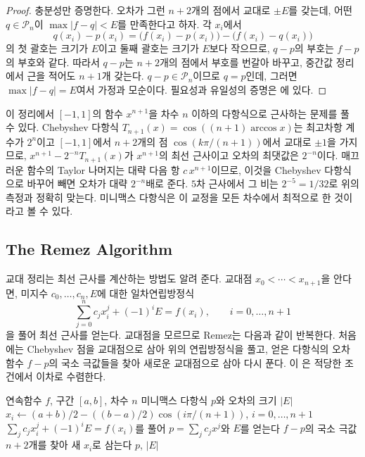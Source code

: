 \begin{proof}
충분성만 증명한다. 오차가 그런 $n+2$개의 점에서 교대로 $\pm E$를 갖는데, 어떤 $q\in\mathcal P_n$이 $\max|f-q|<E$를 만족한다고 하자. 각 $x_i$에서
\[
q(x_i)-p(x_i)=\bigl(f(x_i)-p(x_i)\bigr)-\bigl(f(x_i)-q(x_i)\bigr)
\]
의 첫 괄호는 크기가 $E$이고 둘째 괄호는 크기가 $E$보다 작으므로, $q-p$의 부호는 $f-p$의 부호와 같다. 따라서 $q-p$는 $n+2$개의 점에서 부호를 번갈아 바꾸고, 중간값 정리에서 근을 적어도 $n+1$개 갖는다. $q-p\in\mathcal P_n$이므로 $q=p$인데, 그러면 $\max|f-q|=E$여서 가정과 모순이다. 필요성과 유일성의 증명은 \cite{cheney1998}에 있다.
\end{proof}

이 정리에서 $[-1,1]$의 함수 $x^{n+1}$을 차수 $n$ 이하의 다항식으로 근사하는 문제를 풀 수 있다. Chebyshev 다항식 $T_{n+1}(x)=\cos((n+1)\arccos x)$는 최고차항 계수가 $2^n$이고 $[-1,1]$에서 $n+2$개의 점 $\cos(k\pi/(n+1))$에서 교대로 $\pm1$을 가지므로, $x^{n+1}-2^{-n}T_{n+1}(x)$가 $x^{n+1}$의 최선 근사이고 오차의 최댓값은 $2^{-n}$이다. 매끄러운 함수의 Taylor 나머지는 대략 다음 항 $c\,x^{n+1}$이므로, 이것을 Chebyshev 다항식으로 바꾸어 빼면 오차가 대략 $2^{-n}$배로 준다. $5$차 근사에서 그 비는 $2^{-5}=1/32$로 위의 측정과 정확히 맞는다. 미니맥스 다항식은 이 교정을 모든 차수에서 최적으로 한 것이라고 볼 수 있다.

\subsection{The Remez Algorithm}

교대 정리는 최선 근사를 계산하는 방법도 알려 준다. 교대점 $x_0<\cdots<x_{n+1}$을 안다면, 미지수 $c_0,\dots,c_n,E$에 대한 일차연립방정식
\[
\sum_{j=0}^nc_jx_i^j+(-1)^iE=f(x_i),\qquad i=0,\dots,n+1
\]
을 풀어 최선 근사를 얻는다. 교대점을 모르므로 Remez는 다음과 같이 반복한다. 처음에는 Chebyshev 점을 교대점으로 삼아 위의 연립방정식을 풀고, 얻은 다항식의 오차 함수 $f-p$의 국소 극값들을 찾아 새로운 교대점으로 삼아 다시 푼다. 이 은 적당한 조건에서 이차로 수렴한다\cite{trefethen2019atap}.

\begin{algorithm}[t]
\begin{algorithmic}[1]
\Require 연속함수 $f$, 구간 $[a,b]$, 차수 $n$
\Ensure 미니맥스 다항식 $p$와 오차의 크기 $|E|$
\State $x_i\gets(a+b)/2-((b-a)/2)\cos(i\pi/(n+1))$, $i=0,\dots,n+1$ 
\Repeat
  \State $\sum_jc_jx_i^j+(-1)^iE=f(x_i)$를 풀어 $p=\sum_jc_jx^j$와 $E$를 얻는다
  \State $f-p$의 국소 극값 $n+2$개를 찾아 새 $x_i$로 삼는다 
\State \Return $p$, $|E|$
\end{algorithmic}
\caption{Remez의 교환 알고리즘}
\label{alg:remez}
\end{algorithm}

